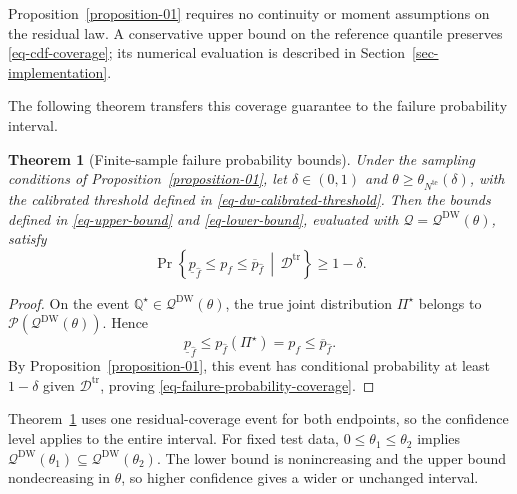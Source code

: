 \documentclass[review,11pt,3p,authoryear,nopreprintline]{elsarticle}
\newtheorem{theorem}{Theorem}
\begin{document}
Proposition~\ref{proposition-01} requires no continuity or moment assumptions on the residual law. A conservative upper bound on the reference quantile preserves \eqref{eq-cdf-coverage}; its numerical evaluation is described in Section~\ref{sec-implementation}.

The following theorem transfers this coverage guarantee to the failure probability interval.

\begin{theorem}[Finite-sample failure probability bounds]
  \label{theorem-01}
  Under the sampling conditions of Proposition~\ref{proposition-01}, let $\delta\in(0,1)$ and $\theta\ge\theta_{N^{\mathrm{te}}}(\delta)$, with the calibrated threshold defined in \eqref{eq-dw-calibrated-threshold}. Then the bounds defined in \eqref{eq-upper-bound} and \eqref{eq-lower-bound}, evaluated with $\mathcal Q=\mathcal Q^{\mathrm{DW}}(\theta)$, satisfy
  \begin{equation}
    \Pr\left\{\underline p_{\hat f}\le p_f\le\overline p_{\hat f}\,\middle|\,\mathcal D^{\mathrm{tr}}\right\}\ge1-\delta.
    \label{eq-failure-probability-coverage}
  \end{equation}
\end{theorem}

\begin{proof}
  On the event $\mathbb Q^\star\in\mathcal Q^{\mathrm{DW}}(\theta)$, the true joint distribution $\Pi^\star$ belongs to $\mathcal P\left(\mathcal Q^{\mathrm{DW}}(\theta)\right)$. Hence
  \[
    \underline p_{\hat f}\le p_{\hat f}(\Pi^\star)=p_f\le\overline p_{\hat f}.
  \]
  By Proposition~\ref{proposition-01}, this event has conditional probability at least $1-\delta$ given $\mathcal D^{\mathrm{tr}}$, proving \eqref{eq-failure-probability-coverage}.
\end{proof}

Theorem~\ref{theorem-01} uses one residual-coverage event for both endpoints, so the confidence level applies to the entire interval. For fixed test data, $0\le\theta_1\le\theta_2$ implies $\mathcal Q^{\mathrm{DW}}(\theta_1)\subseteq\mathcal Q^{\mathrm{DW}}(\theta_2)$. The lower bound is nonincreasing and the upper bound nondecreasing in $\theta$, so higher confidence gives a wider or unchanged interval.
\end{document}
